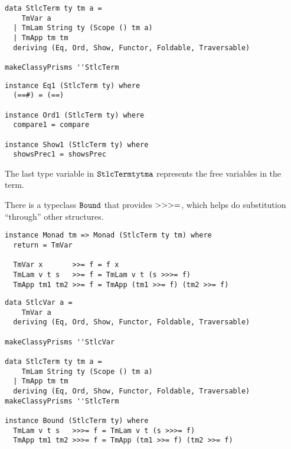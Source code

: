 \documentclass{beamer}
\begin{document}
\begin{frame}[fragile]
  \begin{verbatim}
data StlcTerm ty tm a =
    TmVar a
  | TmLam String ty (Scope () tm a)
  | TmApp tm tm
  deriving (Eq, Ord, Show, Functor, Foldable, Traversable)

makeClassyPrisms ''StlcTerm
  \end{verbatim}  
\end{frame}

\begin{frame}[fragile]
  \begin{verbatim}
instance Eq1 (StlcTerm ty) where
  (==#) = (==)

instance Ord1 (StlcTerm ty) where
  compare1 = compare

instance Show1 (StlcTerm ty) where
  showsPrec1 = showsPrec
  \end{verbatim}  
\end{frame}

\begin{frame}[c]
  \begin{center}
   The last type variable in $\tt{StlcTerm ty tm a}$ represents the free
   variables in the term.
  \end{center}
\end{frame}

\begin{frame}[c]
  \begin{center}
  There is a typeclass $\tt{Bound}$ that provides $\tt{>>>=}$, which helps do
  substitution ``through'' other structures.
  \end{center}
\end{frame}

\begin{frame}[fragile]
  \begin{verbatim}
instance Monad tm => Monad (StlcTerm ty tm) where
  return = TmVar 

  TmVar x       >>= f = f x
  TmLam v t s   >>= f = TmLam v t (s >>>= f)
  TmApp tm1 tm2 >>= f = TmApp (tm1 >>= f) (tm2 >>= f)
  \end{verbatim}  
\end{frame}

\begin{frame}[fragile]
  \begin{verbatim}
data StlcVar a =
    TmVar a
  deriving (Eq, Ord, Show, Functor, Foldable, Traversable)

makeClassyPrisms ''StlcVar

data StlcTerm ty tm a =
    TmLam String ty (Scope () tm a)
  | TmApp tm tm
  deriving (Eq, Ord, Show, Functor, Foldable, Traversable)
makeClassyPrisms ''StlcTerm

instance Bound (StlcTerm ty) where
  TmLam v t s   >>>= f = TmLam v t (s >>>= f)
  TmApp tm1 tm2 >>>= f = TmApp (tm1 >>= f) (tm2 >>= f)
  \end{verbatim}  
\end{frame}
\end{document}
